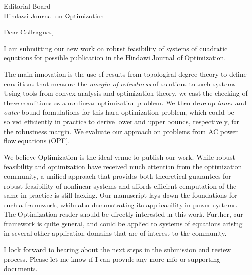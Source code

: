 \documentclass[12pt]{letter}
\date{March 28, 2022}
\begin{document}
\begin{letter}{Editorial Board\\
Hindawi Journal on Optimization
  }

\subject{Submission of our manuscript on Robust Feasibility using Topological Degree Theory.}

\opening{Dear Colleagues,}

I am submitting our new work on robust feasibility of systems of quadratic equations for possible publication in the Hindawi Journal of Optimization.

The main innovation is the use of results from topological degree theory to define conditions that measure the \emph{margin of robustness} of solutions to such systems.
Using tools from convex analysis and optimization theory, we cast the checking of these conditions as a nonlinear optimization problem.
We then develop \emph{inner} and \emph{outer} bound formulations for this hard optimization problem, which could be solved efficiently in practice to derive lower and upper bounds, respectively, for the robustness margin.
We evaluate our approach on problems from AC power flow equations (OPF).

We believe Optimization is the ideal venue to publish our work.
While robust feasibility and optimization have received much attention from the optimization community, a unified approach that provides both theoretical guarantees for robust feasibility of nonlinear systems and affords efficient computation of the same in practice is still lacking.
Our manuscript lays down the foundations for such a framework, while also demonstrating its applicability in power systems.
The Optimization reader should be directly interested in this work.
Further, our framework is quite general, and could be applied to systems of equations arising in several other application domains that are of interest to the community.

I look forward to hearing about the next steps in the submission and review process.
Please let me know if I can provide any more info or supporting documents.

\end{letter}
\end{document}

